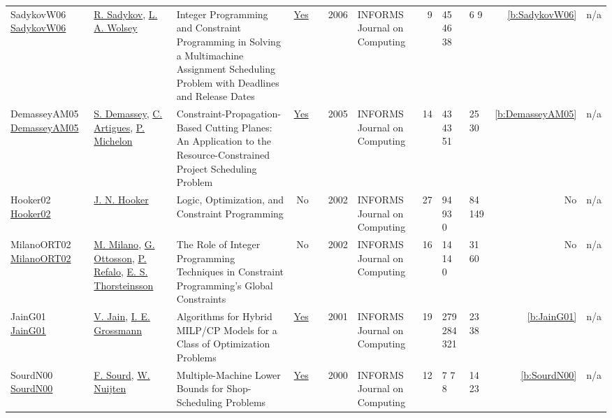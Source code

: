 {\begin{longtable}{>{\raggedright\arraybackslash}p{3cm}>{\raggedright\arraybackslash}p{4.5cm}>{\raggedright\arraybackslash}p{6.0cm}rrrp{2.5cm}rp{1cm}p{1cm}rr}
SadykovW06 \href{https://doi.org/10.1287/ijoc.1040.0110}{SadykovW06} & \hyperref[auth:a384]{R. Sadykov}, \hyperref[auth:a224]{L. A. Wolsey} & Integer Programming and Constraint Programming in Solving a Multimachine Assignment Scheduling Problem with Deadlines and Release Dates & \href{../works/SadykovW06.pdf}{Yes} & \cite{SadykovW06} & 2006 & \cellcolor{red!20}INFORMS Journal on Computing & 9 & 45 46 38 & 6 9 & \ref{b:SadykovW06} & n/a\\
DemasseyAM05 \href{http://dx.doi.org/10.1287/ijoc.1030.0043}{DemasseyAM05} & \hyperref[auth:a243]{S. Demassey}, \hyperref[auth:a6]{C. Artigues}, \hyperref[auth:a355]{P. Michelon} & \cellcolor{green!10}Constraint-Propagation-Based Cutting Planes: An Application to the Resource-Constrained Project Scheduling Problem & \href{../works/DemasseyAM05.pdf}{Yes} & \cite{DemasseyAM05} & 2005 & \cellcolor{red!20}INFORMS Journal on Computing & 14 & 43 43 51 & 25 30 & \ref{b:DemasseyAM05} & n/a\\
Hooker02 \href{http://dx.doi.org/10.1287/ijoc.14.4.295.2828}{Hooker02} & \hyperref[auth:a160]{J. N. Hooker} & Logic, Optimization, and Constraint Programming & No & \cite{Hooker02} & 2002 & \cellcolor{red!20}INFORMS Journal on Computing & 27 & 94 93 0 & 84 149 & No & n/a\\
MilanoORT02 \href{http://dx.doi.org/10.1287/ijoc.14.4.387.2830}{MilanoORT02} & \hyperref[auth:a143]{M. Milano}, \hyperref[auth:a852]{G. Ottosson}, \hyperref[auth:a254]{P. Refalo}, \hyperref[auth:a874]{E. S. Thorsteinsson} & The Role of Integer Programming Techniques in Constraint Programming's Global Constraints & No & \cite{MilanoORT02} & 2002 & \cellcolor{red!20}INFORMS Journal on Computing & 16 & 14 14 0 & 31 60 & No & n/a\\
JainG01 \href{http://dx.doi.org/10.1287/ijoc.13.4.258.9733}{JainG01} & \hyperref[auth:a844]{V. Jain}, \hyperref[auth:a382]{I. E. Grossmann} & Algorithms for Hybrid MILP/CP Models for a Class of Optimization Problems & \href{../works/JainG01.pdf}{Yes} & \cite{JainG01} & 2001 & \cellcolor{red!20}INFORMS Journal on Computing & 19 & 279 284 321 & 23 38 & \ref{b:JainG01} & n/a\\
SourdN00 \href{https://doi.org/10.1287/ijoc.12.4.341.11881}{SourdN00} & \hyperref[auth:a775]{F. Sourd}, \hyperref[auth:a656]{W. Nuijten} & Multiple-Machine Lower Bounds for Shop-Scheduling Problems & \href{../works/SourdN00.pdf}{Yes} & \cite{SourdN00} & 2000 & \cellcolor{red!20}INFORMS Journal on Computing & 12 & 7 7 8 & 14 23 & \ref{b:SourdN00} & n/a\\

\end{longtable}}
